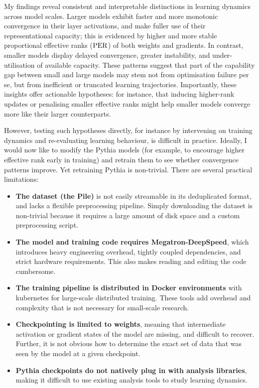 My findings reveal consistent and interpretable distinctions in learning dynamics across model scales. Larger models exhibit faster and more monotonic convergence in their layer activations, and make fuller use of their representational capacity; this is evidenced by higher and more stable proportional effective ranks ($\mathrm{PER}$) of both weights and gradients. In contrast, smaller models display delayed convergence, greater instability, and under-utilisation of available capacity. These patterns suggest that part of the capability gap between small and large models may stem not from optimisation failure per se, but from inefficient or truncated learning trajectories. Importantly, these insights offer actionable hypotheses: for instance, that inducing higher-rank updates or penalising smaller effective ranks might help smaller models converge more like their larger counterparts. 

However, testing such hypotheses directly, for instance by intervening on training dynamics and re-evaluating learning behaviour, is difficult in practice. Ideally, I would now like to modify the Pythia models (for example, to encourage higher effective rank early in training) and retrain them to see whether convergence patterns improve. Yet retraining Pythia is non-trivial. There are several practical limitations:

\begin{itemize}[label=\xmark]
    \item \textbf{The dataset (the Pile)} is not easily streamable in its deduplicated format, and lacks a flexible preprocessing pipeline. Simply downloading the dataset is non-trivial because it requires a large amount of disk space and a custom preprocessing script.
    \item \textbf{The model and training code requires Megatron-DeepSpeed}, which introduces heavy engineering overhead, tightly coupled dependencies, and strict hardware requirements. This also makes reading and editing the code cumbersome.
    \item \textbf{The training pipeline is distributed in Docker environments} with kubernetes for large-scale distributed training. These tools add overhead and complexity that is not necessary for small-scale research.
    \item \textbf{Checkpointing is limited to weights}, meaning that intermediate activation or gradient states of the model are missing, and difficult to recover. Further, it is not obvious how to determine the exact set of data that was seen by the model at a given checkpoint. 
    \item \textbf{Pythia checkpoints do not natively plug in with analysis libraries}, making it difficult to use existing analysis tools to study learning dynamics.
\end{itemize}

